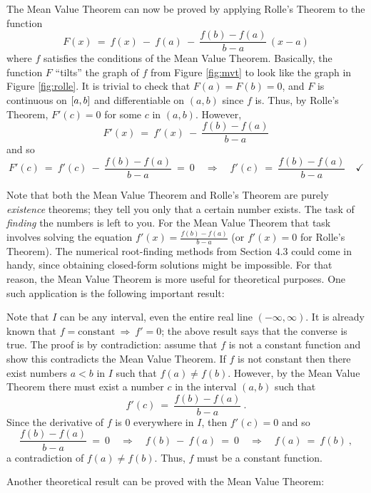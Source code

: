 The Mean Value Theorem can now be proved by applying Rolle's Theorem to the
function
\[
F(x) ~=~ f(x) ~-~ f(a) ~-~ \frac{f(b) - f(a)}{b - a}\,(x - a)
\]
where $f$ satisfies the conditions of the Mean Value Theorem. Basically, the
function $F$
``tilts'' the graph of $f$ from Figure \ref{fig:mvt} to look like the graph in
Figure \ref{fig:rolle}. It is trivial to check that $F(a) = F(b) = 0$, and $F$
is continuous on $\lbrack a,b \rbrack$ and differentiable on $(a,b)$ since $f$ is. Thus,
by Rolle's Theorem, $F'(c) = 0$ for some $c$ in $(a,b)$. However,
\[
F'(x) ~=~ f'(x) ~-~ \frac{f(b) - f(a)}{b - a}
\]
and so
\[
F'(c) ~=~ f'(c) ~-~ \frac{f(b) - f(a)}{b - a} ~=~ 0 \quad\Rightarrow\quad
f'(c) ~=~ \frac{f(b) - f(a)}{b - a} \quad\checkmark
\]

Note that both the Mean Value Theorem and Rolle's Theorem are purely
\emph{existence} theorems; they tell you only that a certain number exists. The
task of \emph{finding} the numbers is left to you.  For the Mean Value Theorem
that task involves solving the equation $f'(x) = \frac{f(b) - f(a)}{b - a}$ (or
$f'(x)=0$ for Rolle's Theorem). The numerical root-finding methods from Section
4.3 could come in handy, since obtaining closed-form solutions might be
impossible. For that reason, the Mean Value Theorem is more useful for
theoretical purposes. One such application is the following important result:
\newpage
{}

\noindent Note that $I$ can be any interval, even the entire
real line $(-\infty,\infty)$. It is already known that $f=\text{constant}
~\Rightarrow~ f'=0$; the above result says that the converse is true.
The proof is by contradiction: assume that $f$ is not a constant function and
show this contradicts the Mean Value Theorem. If $f$ is not constant then there
exist numbers $a < b$ in $I$ such that $f(a) \ne f(b)$. However,
by the Mean Value Theorem there must exist a number $c$ in the interval $(a,b)$
such that
\[
f'(c) ~=~ \frac{f(b) - f(a)}{b - a} ~.
\]
Since the derivative of $f$ is 0 everywhere in $I$, then $f'(c) = 0$ and so
\[
\frac{f(b) - f(a)}{b - a} ~=~ 0 \quad\Rightarrow\quad
f(b) ~-~ f(a) ~=~ 0 \quad\Rightarrow\quad f(a) ~=~ f(b) ~,
\]
a contradiction of $f(a) \ne f(b)$. Thus, $f$ must be a constant function.
\quad\checkmark

Another theoretical result can be proved with the Mean Value Theorem:

